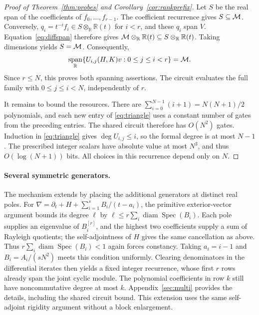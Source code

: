 \documentclass[11pt,letterpaper]{article}
\theoremstyle{definition}\newtheorem{definition}[theorem]{Definition}
\theoremstyle{remark}\newtheorem{remark}[theorem]{Remark}
\DeclareMathOperator{\spanop}{span}\DeclareMathOperator{\im}{im}
\DeclareMathOperator{\diam}{diam}\DeclareMathOperator{\Spec}{Spec}
\newcommand{\R}{\mathbb R}\newcommand{\Q}{\mathbb Q}\newcommand{\Z}{\mathbb Z}
\begin{document}
\begin{proof}[Proof of Theorem~\ref{thm:probes} and Corollary~\ref{cor:rankprefix}]
Let $S$ be the real span of the coefficients of $f_0,\ldots,f_{r-1}$.
The coefficient recurrence gives $S\subseteq\mathcal M$. Conversely,
$q_i=t^{-i}f_i\in S\otimes_\R\R(t)$ for $i<r$, and these $q_i$ span $V$.
Equation~\eqref{eq:diffspan} therefore gives
$\M\otimes_\R\R(t)\subseteq S\otimes_\R\R(t)$.
Taking dimensions yields $S=\mathcal M$. Consequently,
\[
\spanop_\R\{U_{i,j}(H,K)v:0\le j\le i<r\}=\M.
\]
Since $r\le N$, this proves both spanning assertions. The circuit evaluates
the full family with $0\le j\le i<N$, independently of $r$.

It remains to bound the resources. There are
$\sum_{i=0}^{N-1}(i+1)=N(N+1)/2$ polynomials, and each new entry of
\eqref{eq:triangle} uses a constant number of gates from the preceding
entries. The shared circuit therefore has $O(N^2)$ gates. Induction in
\eqref{eq:triangle} gives $\deg U_{i,j}\le i$, so the formal degree is at most
$N-1$. The prescribed integer scalars have absolute value at most $N^3$,
and thus $O(\log(N+1))$ bits. All choices in this recurrence depend only on $N$.
\end{proof}

\paragraph{Several symmetric generators.}
The mechanism extends by placing the additional generators at distinct
real poles. For
$\nabla=\partial_t+H+\sum_{i=1}^sB_i/(t-a_i)$, the primitive exterior-vector
argument bounds its degree $\ell$ by
$\ell\le r\sum_i\diam\Spec(B_i)$. Each pole supplies an eigenvalue of
$B_i^{[r]}$, and the highest two coefficients supply a sum of Rayleigh
quotients; the self-adjointness of $H$ gives the same cancellation as above.
Thus $r\sum_i\diam\Spec(B_i)<1$ again forces constancy. Taking
$a_i=i-1$ and $B_i=A_i/(sN^2)$ meets this condition uniformly. Clearing
denominators in the differential iterates then yields a fixed integer
recurrence, whose first $r$ rows already span the joint cyclic module.
The polynomial coefficients in row $k$ still have noncommutative degree
at most $k$. Appendix~\ref{sec:multi} provides the details, including
the shared circuit bound. This extension uses the same self-adjoint
rigidity argument without a block enlargement.
\end{document}
